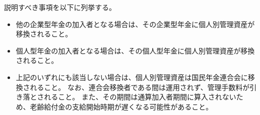 \begin{sol}
  \;

  説明すべき事項を以下に列挙する。

  \begin{itemize}
    \item 他の企業型年金の加入者となる場合は、その企業型年金に個人別管理資産が移換されること。
    \item 個人型年金の加入者となる場合は、その個人型年金に個人別管理資産が移換されること。
    \item 上記のいずれにも該当しない場合は、個人別管理資産は国民年金連合会に移換されること。
    なお、連合会移換者である間は運用されず、管理手数料が引き落とされること。
    また、その期間は通算加入者期間に算入されないため、老齢給付金の支給開始時期が遅くなる可能性があること。
  \end{itemize}
\end{sol}

\newpage


